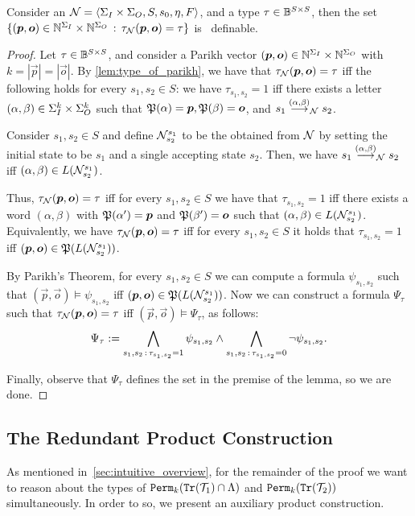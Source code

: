 \begin{lemma}
	\label{lem:parikh_type_definable}
	Consider an \NFA $\mathcal{N}=\left< \Sigma_{I}\times \Sigma_{O},S,s_0,\eta,F\right>$, and a type $\tau\in \mathbb{B}^{S\times S}$, then the set $\{(\boldsymbol{p},\boldsymbol{o})\in \mathbb{N}^{\Sigma_{I}} \times \mathbb{N}^{\Sigma_{O}}\, :\, \tau_{\mathcal{N}}(\boldsymbol{p},\boldsymbol{o})=\tau\}$ is \PA~definable.
\end{lemma}
\begin{proof}
	Let $\tau\in \mathbb{B}^{S\times S}$, and consider a Parikh vector $(\boldsymbol{p},\boldsymbol{o})\in \mathbb{N}^{\Sigma_{I}} \times \mathbb{N}^{\Sigma_{O}}$ with $k=|\vec{p}|=|\vec{o}|$. By \autoref{lem:type_of_parikh}, we have that $\tau_{\mathcal{N}}(\boldsymbol{p},\boldsymbol{o})=\tau$ iff the following holds for every $s_1,s_2\in S$: we have $\tau_{s_1,s_2}=1$ iff 
	there exists a letter $(\alpha,\beta)\in \Sigma_{I}^k\times \Sigma_{O}^k$ such that $\mathfrak{P}(\alpha)=\boldsymbol{p},\mathfrak{P}(\beta)=\boldsymbol{o}$, and $s_1\stackrel{(\alpha,\beta)}{\longrightarrow}_{\mathcal{N}} s_2$.

	Consider $s_1,s_2\in S$ and define $\mathcal{N}^{s_1}_{s_2}$ to be the \NFA obtained from $\mathcal{N}$ by setting the initial state to be $s_1$ and a single accepting state $s_2$.
	Then, we have $s_1\stackrel{(\alpha,\beta)}{\longrightarrow}_{\mathcal{N}} s_2$ iff $(\alpha,\beta)\in L(\mathcal{N}^{s_1}_{s_2})$. 
	
	Thus, $\tau_{\mathcal{N}}(\boldsymbol{p},\boldsymbol{o})=\tau$ iff for every $s_1,s_2\in S$ we have that $\tau_{s_1,s_2}=1$ iff there exists a word $(\alpha,\beta)$ with $\mathfrak{P}(\alpha')=\boldsymbol{p}$ and $\mathfrak{P}(\beta')=\boldsymbol{o}$ such that $(\alpha,\beta)\in L(\mathcal{N}^{s_1}_{s_2})$.
	Equivalently, we have $\tau_{\mathcal{N}}(\boldsymbol{p},\boldsymbol{o})=\tau$ iff for every $s_1,s_2\in S$ it holds that $\tau_{s_1,s_2}=1$ iff $(\boldsymbol{p},\boldsymbol{o})\in \mathfrak{P}(L(\mathcal{N}^{s_1}_{s_2}))$.
	
	By Parikh's Theorem, for every $s_1,s_2\in S$ we can compute a \PA formula $\psi_{s_1,s_2}$ such that $(\vec{p},\vec{o})\models \psi_{s_1,s_2}$ iff $(\boldsymbol{p},\boldsymbol{o})\in \mathfrak{P}(L(\mathcal{N}^{s_1}_{s_2}))$. Now we can construct a \PA formula $\Psi_{\tau}$ such that $\tau_{\mathcal{N}}(\boldsymbol{p},\boldsymbol{o})=\tau$ iff $(\vec{p},\vec{o})\models \Psi_\tau$, as follows:
	\[\Psi_\tau:= \bigwedge_{s_1,s_2\, :\, \tau_{s_1,s_2}=1} \psi_{s_1,s_2}\wedge \bigwedge_{s_1,s_2\, :\, \tau_{s_1,s_2}=0}\neg \psi_{s_1,s_2}.\]
	
	Finally, observe that $\Psi_\tau$ defines the set in the premise of the lemma, so we are done.
\end{proof}

\subsection*{The Redundant Product Construction}
As mentioned in~\autoref{sec:intuitive_overview}, for the remainder of the proof we want to reason about the types of ${\mathtt{Perm}}_k({\mathtt{Tr}}(\mathcal{T}_1)\cap \Lambda)$ and ${\mathtt{Perm}}_k({\mathtt{Tr}}(\mathcal{T}_2))$ simultaneously. In order to so, we present an auxiliary product construction.

